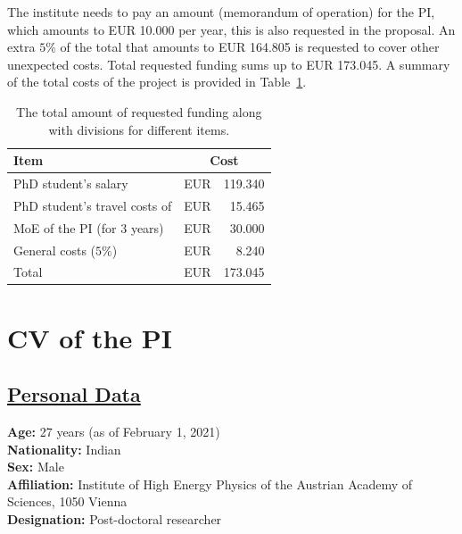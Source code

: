 \documentclass[a4paper,11pt]{article}
\begin{document}
The institute needs to pay an amount (memorandum of operation) for the PI, which amounts to EUR 10.000 per year, 
this is also requested in the proposal.
An extra $5\%$ of the total that amounts to EUR 164.805 is requested to cover other unexpected costs.  
Total requested funding sums up to EUR 173.045.  
A summary of the total costs of the project is provided in Table~\ref{Tab:Total_cost}.
\begin{table}
\caption{The total amount of requested funding along with divisions for different items.}
\begin{center}
{\renewcommand{\arraystretch}{1.3}
\begin{tabular}{m{6 cm}| r r}
Item & \multicolumn{2}{c}{ Cost } \\
\hline 
PhD student's salary & EUR & 119.340  \\
PhD student's travel costs of & EUR & 15.465 \\
MoE of the PI (for 3 years) & EUR & 30.000 \\
\hline
General costs ($5\%$) & EUR & 8.240  \\
\hline
Total & EUR & 173.045 
\end{tabular}
}
\end{center}
\label{Tab:Total_cost}
\end{table}

\newpage


\section{CV of the PI}

\subsection*{\underline{Personal Data}}

\textbf{Age:} 27 years (as of February 1, 2021)\\
\textbf{Nationality:} Indian \\
\textbf{Sex:} Male \\
\textbf{Affiliation:} Institute of High Energy Physics of the Austrian Academy of Sciences, 1050 Vienna \\
\textbf{Designation:} Post-doctoral researcher 

\end{document}
